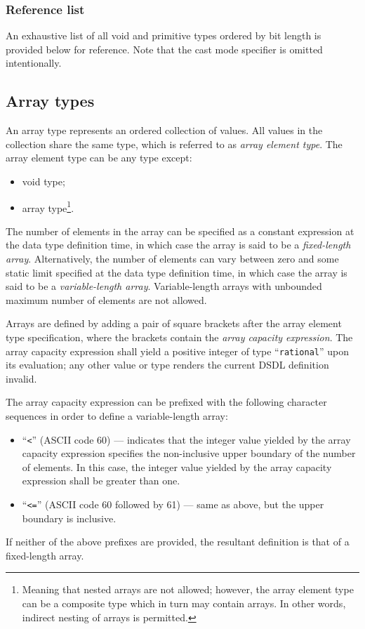 \subsubsection{Reference list}

An exhaustive list of all void and primitive types
ordered by bit length is provided below for reference.
Note that the cast mode specifier is omitted intentionally.

\immediate{}
\immediate{}
\immediate

\subsection{Array types}

An array type represents an ordered collection of values.
All values in the collection share the same type, which is referred to as \emph{array element type}.
The array element type can be any type except:
\begin{itemize}
    \item void type;
    \item array type\footnote{%
              Meaning that nested arrays are not allowed;
              however, the array element type can be a composite type which in turn may contain arrays.
              In other words, indirect nesting of arrays is permitted.
          }.
\end{itemize}

The number of elements in the array can be specified as a constant expression at the data type definition time,
in which case the array is said to be a \emph{fixed-length array}.
Alternatively, the number of elements can vary between zero and some static limit specified
at the data type definition time,
in which case the array is said to be a \emph{variable-length array}.
Variable-length arrays with unbounded maximum number of elements are not allowed.

Arrays are defined by adding a pair of square brackets after the array element type specification,
where the brackets contain the \emph{array capacity expression}.
The array capacity expression shall yield a positive integer of type ``\verb|rational|'' upon its evaluation;
any other value or type renders the current DSDL definition invalid.

The array capacity expression can be prefixed with the following character sequences in order to define
a variable-length array:
\begin{itemize}
    \item ``\verb|<|'' (ASCII code 60) --- indicates that the integer value yielded by the array capacity expression
    specifies the non-inclusive upper boundary of the number of elements.
    In this case, the integer value yielded by the array capacity expression shall be greater than one.

    \item ``\verb|<=|'' (ASCII code 60 followed by 61) --- same as above, but the upper boundary is inclusive.
\end{itemize}
If neither of the above prefixes are provided, the resultant definition is that of a fixed-length array.

